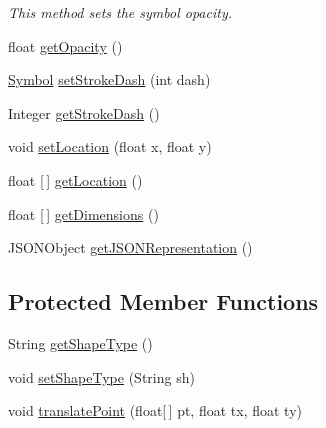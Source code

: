 \begin{DoxyCompactItemize}
\begin{DoxyCompactList}\small\item\em This method sets the symbol opacity. \end{DoxyCompactList}\item 
float \hyperlink{classbridges_1_1base_1_1_symbol_af249b2a8a11a70edc8f51ee19e6cd927}{get\+Opacity} ()
\item 
\hyperlink{classbridges_1_1base_1_1_symbol}{Symbol} \hyperlink{classbridges_1_1base_1_1_symbol_ad36224ec7cb588dbbaa8040ef59ffbfc}{set\+Stroke\+Dash} (int dash)
\item 
Integer \hyperlink{classbridges_1_1base_1_1_symbol_a31ff460ae6b24ed968c1045e2533a967}{get\+Stroke\+Dash} ()
\item 
void \hyperlink{classbridges_1_1base_1_1_symbol_a168cea9fd50ad311fe9c74215ab708ac}{set\+Location} (float x, float y)
\item 
float \mbox{[}$\,$\mbox{]} \hyperlink{classbridges_1_1base_1_1_symbol_a67d925fa6fcf9b78c449b63182029e56}{get\+Location} ()
\item 
float \mbox{[}$\,$\mbox{]} \hyperlink{classbridges_1_1base_1_1_symbol_a6cf741f603dd6347325e95a2b4d13d2e}{get\+Dimensions} ()
\item 
J\+S\+O\+N\+Object \hyperlink{classbridges_1_1base_1_1_symbol_aeba4cfa5b39fe03e72a568a8b7452e60}{get\+J\+S\+O\+N\+Representation} ()
\end{DoxyCompactItemize}
\subsection*{Protected Member Functions}
\begin{DoxyCompactItemize}
\item 
String \hyperlink{classbridges_1_1base_1_1_symbol_a10f3cde5331f1af9303b08249e719a9d}{get\+Shape\+Type} ()
\item 
void \hyperlink{classbridges_1_1base_1_1_symbol_adf9559ecef8902f83cbb6bbefdf1c601}{set\+Shape\+Type} (String sh)
\item 
void \hyperlink{classbridges_1_1base_1_1_symbol_affb384e1e7e22d7bcb6ca0bf0d4ebbc3}{translate\+Point} (float\mbox{[}$\,$\mbox{]} pt, float tx, float ty)
\end{DoxyCompactItemize}
